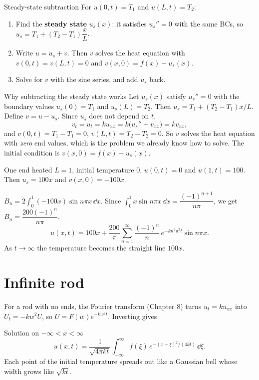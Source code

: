 \begin{methodbox}{Steady-state subtraction}
For $u(0,t)=T_1$ and $u(L,t)=T_2$:
\begin{enumerate}
  \item Find the \textbf{steady state} $u_s(x)$: it satisfies $u_s''=0$ with the same BCs, so $u_s = T_1 + (T_2-T_1)\dfrac xL$.
  \item Write $u = u_s + v$. Then $v$ solves the heat equation with $v(0,t)=v(L,t)=0$ and $v(x,0) = f(x) - u_s(x)$.
  \item Solve for $v$ with the sine series, and add $u_s$ back.
\end{enumerate}
\end{methodbox}

\begin{derivbox}{Why subtracting the steady state works}
Let $u_s(x)$ satisfy $u_s'' = 0$ with the boundary values $u_s(0)=T_1$ and $u_s(L)=T_2$. Then $u_s = T_1 + (T_2-T_1)x/L$. Define $v = u - u_s$. Since $u_s$ does not depend on $t$,
\[ v_t = u_t = ku_{xx} = k\big(u_s'' + v_{xx}\big) = kv_{xx}, \]
and $v(0,t) = T_1 - T_1 = 0$, $v(L,t) = T_2 - T_2 = 0$. So $v$ solves the heat equation with \emph{zero} end values, which is the problem we already know how to solve. The initial condition is $v(x,0) = f(x) - u_s(x)$.
\end{derivbox}

\begin{examplebox}{One end heated}
$L=1$, initial temperature $0$, $u(0,t)=0$ and $u(1,t)=100$. Then $u_s = 100x$ and $v(x,0) = -100x$.

$B_n = 2\displaystyle\int_0^1(-100x)\sin n\pi x\,\dd x$. Since $\displaystyle\int_0^1x\sin n\pi x\,\dd x = \dfrac{(-1)^{n+1}}{n\pi}$, we get $B_n = \dfrac{200(-1)^n}{n\pi}$.
\[ u(x,t) = 100x + \frac{200}{\pi}\sum_{n=1}^\infty\frac{(-1)^n}{n}\,e^{-kn^2\pi^2t}\sin n\pi x. \]
As $t\to\infty$ the temperature becomes the straight line $100x$.
\end{examplebox}

\section{Infinite rod}

For a rod with no ends, the Fourier transform (Chapter 8) turns $u_t = ku_{xx}$ into $U_t = -kw^2U$, so $U = F(w)e^{-kw^2t}$. Inverting gives

\begin{defbox}{Solution on $-\infty<x<\infty$}
\[ u(x,t) = \frac{1}{\sqrt{4\pi kt}}\int_{-\infty}^{\infty}f(\xi)\,e^{-(x-\xi)^2/(4kt)}\,\dd\xi. \]
Each point of the initial temperature spreads out like a Gaussian bell whose width grows like $\sqrt{kt}$.
\end{defbox}

